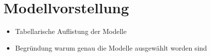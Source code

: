 \section{Modellvorstellung}\label{sec:modellvorstellung}

\begin{itemize}
    \item Tabellarische Auflistung der Modelle
    \item Begründung warum genau die Modelle ausgewählt worden sind
\end{itemize}